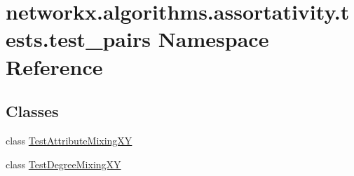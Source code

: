 \hypertarget{namespacenetworkx_1_1algorithms_1_1assortativity_1_1tests_1_1test__pairs}{}\section{networkx.\+algorithms.\+assortativity.\+tests.\+test\+\_\+pairs Namespace Reference}
\label{namespacenetworkx_1_1algorithms_1_1assortativity_1_1tests_1_1test__pairs}
\subsection*{Classes}
\begin{DoxyCompactItemize}
\item 
class \hyperlink{classnetworkx_1_1algorithms_1_1assortativity_1_1tests_1_1test__pairs_1_1TestAttributeMixingXY}{Test\+Attribute\+Mixing\+XY}
\item 
class \hyperlink{classnetworkx_1_1algorithms_1_1assortativity_1_1tests_1_1test__pairs_1_1TestDegreeMixingXY}{Test\+Degree\+Mixing\+XY}
\end{DoxyCompactItemize}
